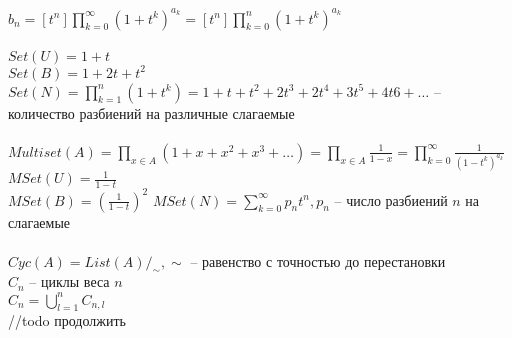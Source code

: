 \documentclass[12pt]{article}
\begin{document}
$b_n = [t^n] \prod_{k=0}^\infty (1+t^k)^{a_k} = [t^n]\prod_{k=0}^n (1+t^k)^{a_k}$\\\\
$Set(U) = 1 + t$\\
$Set(B) = 1 + 2t + t^2$\\
$Set(N) = \prod_{k=1}^n (1+t^k) = 1 + t + t^2 + 2t^3 + 2t^4 + 3t^5 + 4t6+ \ldots$ -- количество разбиений на различные слагаемые\\\\
$Multiset(A) = \prod_{x\in A} (1+x+x^2+x^3 + \ldots) = \prod_{x\in A} \frac1{1-x} = \prod_{k=0}^\infty \frac{1}{(1-t^k)^{a_k}}$\\
$MSet(U) = \frac{1}{1-t}$\\
$MSet(B) = (\frac1{1-t})^2$
$MSet(N) = \sum_{k=0}^\infty p_nt^n, p_n$ -- число разбиений $n$ на слагаемые\\\\
$Cyc(A) = List(A) /_{\sim}, \sim$ -- равенство с точностью до перестановки\\
$C_n$ -- циклы веса $n$\\
$C_n = \bigcup_{l=1}^n C_{n,l}$\\
//todo продолжить
\end{document}
